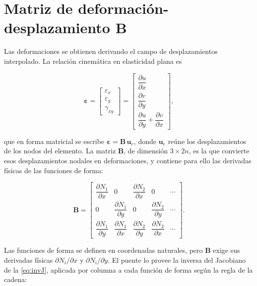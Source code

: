 \section{Matriz de deformación-desplazamiento \texorpdfstring{$\bm{B}$}{B}}
\label{sec:matriz-b}

Las deformaciones se obtienen derivando el campo de desplazamientos interpolado. La relación cinemática en elasticidad plana es

\begin{equation}
\bm{\varepsilon} =
\begin{bmatrix} \varepsilon_x \\ \varepsilon_y \\ \gamma_{xy} \end{bmatrix}
=
\begin{bmatrix}
\dfrac{\partial u}{\partial x} \\[4pt]
\dfrac{\partial v}{\partial y} \\[4pt]
\dfrac{\partial u}{\partial y} + \dfrac{\partial v}{\partial x}
\end{bmatrix},
\label{eq:cinematica}
\end{equation}

que en forma matricial se escribe $\bm{\varepsilon} = \bm{B}\,\bm{u}_e$, donde $\bm{u}_e$ reúne los desplazamientos de los nodos del elemento. La matriz $\bm{B}$, de dimensión $3 \times 2n$, es la que convierte esos desplazamientos nodales en deformaciones, y contiene para ello las derivadas físicas de las funciones de forma:

\begin{equation}
\bm{B} =
\begin{bmatrix}
\dfrac{\partial N_1}{\partial x} & 0 & \dfrac{\partial N_2}{\partial x} & 0 & \cdots \\[6pt]
0 & \dfrac{\partial N_1}{\partial y} & 0 & \dfrac{\partial N_2}{\partial y} & \cdots \\[6pt]
\dfrac{\partial N_1}{\partial y} & \dfrac{\partial N_1}{\partial x} & \dfrac{\partial N_2}{\partial y} & \dfrac{\partial N_2}{\partial x} & \cdots
\end{bmatrix}.
\label{eq:matriz-B}
\end{equation}

Las funciones de forma se definen en coordenadas naturales, pero $\bm{B}$ exige sus derivadas físicas $\partial N_i/\partial x$ y $\partial N_i/\partial y$. El puente lo provee la inversa del Jacobiano de la \autoref{eq:invJ}, aplicada por columna a cada función de forma según la regla de la cadena:

